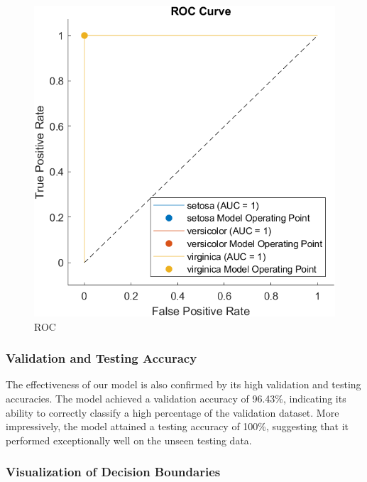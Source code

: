 \documentclass[conference]{inc/IEEEtran}
\begin{document}
\begin{figure}
  \includegraphics[width=0.8\linewidth]{figures/roc.png}
  \caption{ROC}
  \label{fig:boat1}
\end{figure}

\subsubsection{Validation and Testing Accuracy}

The effectiveness of our model is also confirmed by its high validation and testing accuracies. The model achieved a validation accuracy of 96.43\%, indicating its ability to correctly classify a high percentage of the validation dataset. More impressively, the model attained a testing accuracy of 100\%, suggesting that it performed exceptionally well on the unseen testing data.

\subsubsection{Visualization of Decision Boundaries}
\end{document}
